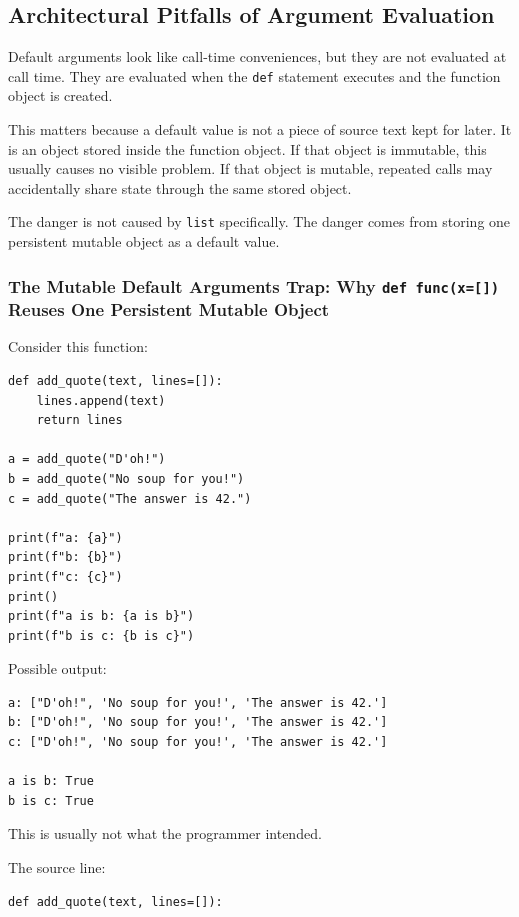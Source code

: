 \subsection{Architectural Pitfalls of Argument Evaluation}

Default arguments look like call-time conveniences, but they are not evaluated at call time. They are evaluated when the \texttt{def} statement executes and the function object is created.

This matters because a default value is not a piece of source text kept for later. It is an object stored inside the function object. If that object is immutable, this usually causes no visible problem. If that object is mutable, repeated calls may accidentally share state through the same stored object.

The danger is not caused by \texttt{list} specifically. The danger comes from storing one persistent mutable object as a default value.

\subsubsection{The Mutable Default Arguments Trap: Why \texttt{def func(x=[])} Reuses One Persistent Mutable Object}

Consider this function:

\begin{verbatim}
def add_quote(text, lines=[]):
    lines.append(text)
    return lines

a = add_quote("D'oh!")
b = add_quote("No soup for you!")
c = add_quote("The answer is 42.")

print(f"a: {a}")
print(f"b: {b}")
print(f"c: {c}")
print()
print(f"a is b: {a is b}")
print(f"b is c: {b is c}")
\end{verbatim}

Possible output:

\begin{verbatim}
a: ["D'oh!", 'No soup for you!', 'The answer is 42.']
b: ["D'oh!", 'No soup for you!', 'The answer is 42.']
c: ["D'oh!", 'No soup for you!', 'The answer is 42.']

a is b: True
b is c: True
\end{verbatim}

This is usually not what the programmer intended.

The source line:

\begin{verbatim}
def add_quote(text, lines=[]):
\end{verbatim}

